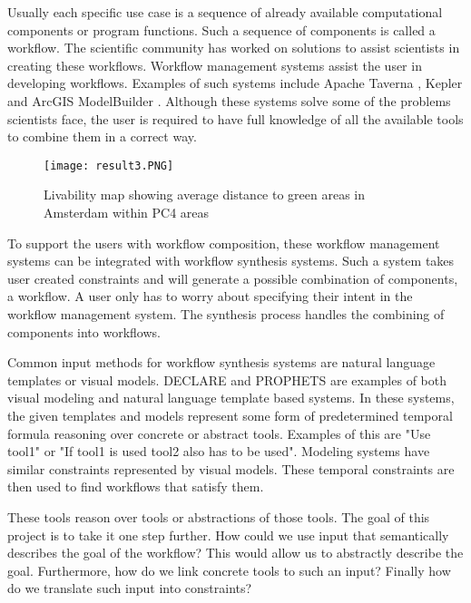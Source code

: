 \documentclass{article}
\begin{document}
Usually each specific use case is a sequence of already available computational components or program functions. Such a sequence of components is called a workflow. The scientific community has worked on solutions to assist scientists in creating these workflows. Workflow management systems assist the user in developing workflows. Examples of such systems include Apache Taverna \cite{wolstencroft2013taverna}, Kepler \cite{altintas2004kepler} and ArcGIS ModelBuilder \cite{allen2011getting}. Although these systems solve some of the problems scientists face, the user is required to have full knowledge of all the available tools to combine them in a correct way. 



\begin{figure}
  \centering
    \texttt{[image: result3.PNG]}
    \caption{Livability map showing average distance to green areas in Amsterdam within PC4 areas }
    \label{figure:livability}
\end{figure}

To support the users with workflow composition, these workflow management systems can be integrated with workflow synthesis systems. Such a system takes user created constraints and will generate a possible combination of components, a workflow. A user only has to worry about specifying their intent in the workflow management system. The synthesis process handles the combining of components into workflows. 

Common input methods for workflow synthesis systems are natural language templates or visual models. DECLARE \cite{pesic2007declare} and PROPHETS \cite{Prophets} are examples of both visual modeling and natural language template based systems. In these systems, the given templates and models represent some form of predetermined temporal formula reasoning over concrete or abstract tools. Examples of this are "Use tool1" or "If tool1 is used tool2 also has to be used". Modeling systems have similar constraints represented by visual models. These temporal constraints are then used to find workflows that satisfy them.


These tools reason over tools or abstractions of those tools. The goal of this project is to take it one step further. 
How could we use input that semantically describes the goal of the workflow? This would allow us to abstractly describe the goal. Furthermore, how do we link concrete tools to such an input? Finally how do we translate such input into constraints? 
\end{document}
